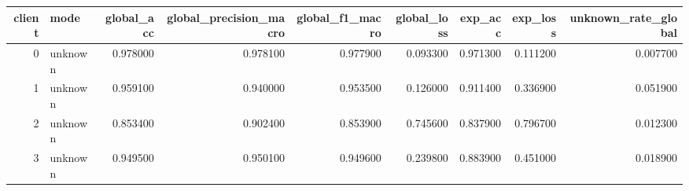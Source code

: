 \begin{tabular}{rlrrrrrrr}
\toprule
client & mode & global_acc & global_precision_macro & global_f1_macro & global_loss & exp_acc & exp_loss & unknown_rate_global \\
\midrule
0 & unknown & 0.978000 & 0.978100 & 0.977900 & 0.093300 & 0.971300 & 0.111200 & 0.007700 \\
1 & unknown & 0.959100 & 0.940000 & 0.953500 & 0.126000 & 0.911400 & 0.336900 & 0.051900 \\
2 & unknown & 0.853400 & 0.902400 & 0.853900 & 0.745600 & 0.837900 & 0.796700 & 0.012300 \\
3 & unknown & 0.949500 & 0.950100 & 0.949600 & 0.239800 & 0.883900 & 0.451000 & 0.018900 \\
\bottomrule
\end{tabular}
